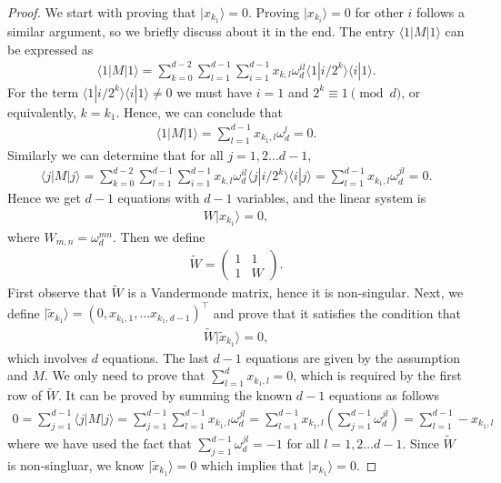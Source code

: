 \documentclass[11pt,letterpaper]{article}
\newcommand{\ket}[1]{|#1\rangle}
\newcommand{\bra}[1]{\langle#1|}
\newcommand{\braket}[2]{\langle#1|#2\rangle}
\newcommand{\1}{\mathbb{1}}
\newcommand{\tW}{\tilde{W}}
\newcommand{\tx}{\tilde{x}}
\theoremstyle{definition}
\begin{document}
\begin{proof}
We start with proving that $\ket{x_{k_1}} = 0$.
Proving $\ket{x_{k_i}} = 0$ for other $i$ follows a similar argument, so we briefly
discuss about it in the end.
The entry $\bra{1}M\ket{1}$ can be expressed as  
\begin{align}
	\bra{1}M\ket{1} = \sum_{k=0}^{d-2}\sum_{l = 1}^{d-1}\sum_{i=1}^{d-1} x_{k, l}\omega_d^{il}\braket{1}{i/2^k}\braket{i}{1}.
\end{align}
For the term $\braket{1}{i/2^k}\braket{i}{1} \neq 0$ we must have $i = 1$ and $2^k \equiv 1 \pmod{d}$, or equivalently,
$k = k_1$. Hence, we can conclude that 
\begin{align}
	\bra{1}M\ket{1} = \sum_{l = 1}^{d-1} x_{k_1,l}\omega_d^l = 0. 
\end{align}
Similarly we can determine that for all $j = 1,2\dots d-1$,
\begin{align}
	\bra{j}M\ket{j} 
	=  \sum_{k=0}^{d-2}\sum_{l = 1}^{d-1}\sum_{i=1}^{d-1} x_{k, l}\omega_d^{il}\braket{j}{i/2^k}\braket{i}{j} 
	= \sum_{l = 1}^{d-1}x_{k_1,l}\omega_d^{jl} = 0.
\end{align}
Hence we get $d-1$ equations with $d-1$ variables, and the linear system is
\begin{align}
	W \ket{x_{k_1}} = 0,
\end{align}
where $W_{m,n} = \omega_d^{mn}$. Then we define
\begin{align}
	\tW = 
	\begin{pmatrix}
	1 & 1 \\
	1 & W
	\end{pmatrix}.
\end{align}
First observe that $\tW$ is a Vandermonde matrix, hence it is non-singular.
Next, we define $\ket{\tx_{k_1}} = (0, x_{k_1,1}, \dots x_{k_1,d-1})^\intercal$ 
and prove that it satisfies the condition
that 
\begin{align}
	\tW \ket{\tx_{k_1}} = 0,
\end{align}
which involves $d$ equations. The last $d-1$ equations are given by the assumption and $M$.
We only need to prove that $\sum_{l=1}^d x_{k_1, l} = 0$, which is required by the first row of $\tW$.
It can be proved by summing the known $d-1$ equations as follows
\begin{align}
	0=\sum_{j = 1}^{d-1} \bra{j}M\ket{j}  
	=  \sum_{j=1}^{d-1}\sum_{l = 1}^{d-1}x_{k_1,l}\omega_d^{jl}
	=\sum_{l = 1}^{d-1}x_{k_1,l} (\sum_{j=1}^{d-1} \omega_d^{jl})
	= \sum_{l = 1}^{d-1}- x_{k_1,l}
\end{align}
where we have used the fact that $\sum_{j=1}^{d-1} \omega_d^{jl} =-1$ for all $l = 1,2\dots d-1$.
Since $\tW$ is non-singluar, we know $\ket{\tx_{k_1}} = 0$ which implies that $\ket{x_{k_1}} = 0$.


\end{proof}
\end{document}
